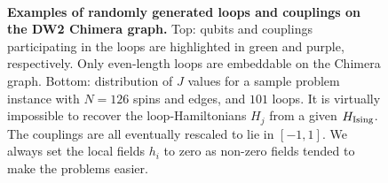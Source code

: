 \begin{figure}[t]
\begin{center}
\\
\caption{\textbf{Examples of randomly generated loops and couplings on the DW2 Chimera graph.} Top: qubits and couplings participating in the loops are highlighted in green and purple, respectively. Only even-length loops are embeddable on the Chimera graph.
Bottom: distribution of $J$ values for a sample problem instance with $N=126$ spins and edges, and $101$ loops. It is virtually impossible to recover the loop-Hamiltonians $H_j$ from a given $H_{\textrm{Ising}}$. The couplings are all eventually rescaled to lie in $[-1,1]$. We always set the local fields $h_i$ to zero as non-zero fields tended to make the problems easier.}
\label{fig:loops}
\end{center}
\end{figure}

